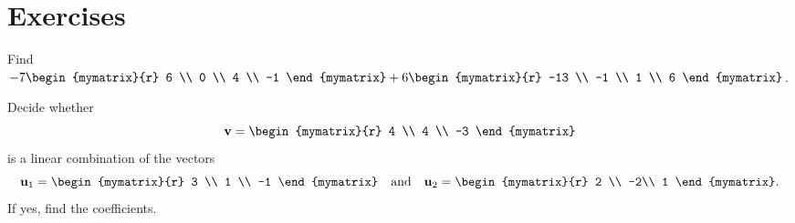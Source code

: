 \section*{Exercises}

\begin{enumialphparenastyle}

\begin{ex}
  Find $-7\begin{mymatrix}{r}
    6 \\
    0 \\
    4 \\
    -1
  \end{mymatrix} +6\begin{mymatrix}{r}
    -13 \\
    -1 \\
    1 \\
    6
  \end{mymatrix}$. 
\end{ex}


\begin{ex}
  Decide whether 
  \begin{equation*}
    \vect{v}= \begin{mymatrix}{r}
      4 \\
      4 \\
      -3
    \end{mymatrix}
  \end{equation*}
  is a linear combination of the vectors 
  \begin{equation*}
    \vect{u}_1 = \begin{mymatrix}{r}
      3 \\
      1 \\
      -1
    \end{mymatrix}
    \quad\mbox{and}\quad
    \vect{u}_2 = 
    \begin{mymatrix}{r}
      2 \\
      -2\\
      1
    \end{mymatrix}.
  \end{equation*}
  If yes, find the coefficients.
  

\end{ex}
\end{enumialphparenastyle}
